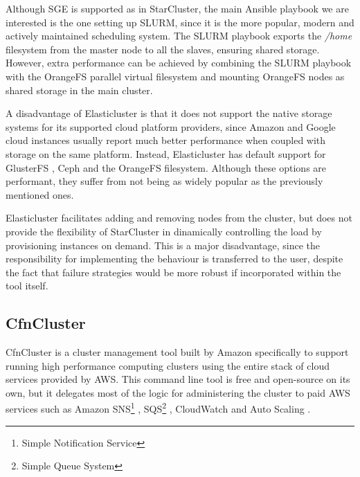 Although SGE is supported as in StarCluster, the main Ansible playbook we are interested is the one setting up SLURM, since it is the more popular, modern and actively maintained scheduling system. The SLURM playbook exports the \textit{/home} filesystem from the master node to all the slaves, ensuring shared storage. However, extra performance can be achieved by combining the SLURM playbook with the OrangeFS parallel virtual filesystem and mounting OrangeFS nodes as shared storage in the main cluster.

A disadvantage of Elasticluster is that it does not support the native storage systems for its supported cloud platform providers, since Amazon and Google cloud instances usually report much better performance when coupled with storage on the same platform. Instead, Elasticluster has default support for GlusterFS \cite{GlusterFS}, Ceph \cite{Ceph} and the OrangeFS \cite{OrangeFS} filesystem. Although these options are performant, they suffer from not being as widely popular as the previously mentioned ones.

Elasticluster facilitates adding and removing nodes from the cluster, but does not provide the flexibility of StarCluster in dinamically controlling the load by provisioning instances on demand. This is a major disadvantage, since the responsibility for implementing the behaviour is transferred to the user, despite the fact that failure strategies would be more robust if incorporated within the tool itself.

\subsection{CfnCluster}

CfnCluster is a cluster management tool built by Amazon specifically to support running high performance computing  clusters using the entire stack of cloud services provided by AWS. This command line tool is free and open-source on its own, but it delegates most of the logic for administering the cluster to paid AWS services such as Amazon SNS\footnote{Simple Notification Service} \cite{SNS}, SQS\footnote{Simple Queue System} \cite{SQS}, CloudWatch \cite{CloudWatch} and Auto Scaling \cite{AutoScaling}.

